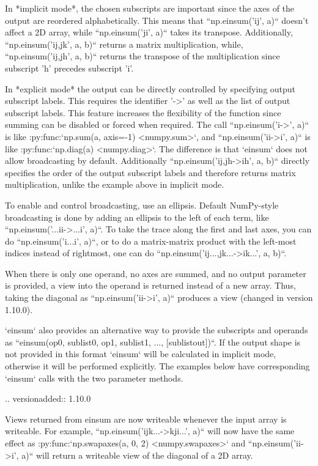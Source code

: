 \begin{DoxyVerb}
In *implicit mode*, the chosen subscripts are important
since the axes of the output are reordered alphabetically.  This
means that ``np.einsum('ij', a)`` doesn't affect a 2D array, while
``np.einsum('ji', a)`` takes its transpose. Additionally,
``np.einsum('ij,jk', a, b)`` returns a matrix multiplication, while,
``np.einsum('ij,jh', a, b)`` returns the transpose of the
multiplication since subscript 'h' precedes subscript 'i'.

In *explicit mode* the output can be directly controlled by
specifying output subscript labels.  This requires the
identifier '->' as well as the list of output subscript labels.
This feature increases the flexibility of the function since
summing can be disabled or forced when required. The call
``np.einsum('i->', a)`` is like :py:func:`np.sum(a, axis=-1) <numpy.sum>`,
and ``np.einsum('ii->i', a)`` is like :py:func:`np.diag(a) <numpy.diag>`.
The difference is that `einsum` does not allow broadcasting by default.
Additionally ``np.einsum('ij,jh->ih', a, b)`` directly specifies the
order of the output subscript labels and therefore returns matrix
multiplication, unlike the example above in implicit mode.

To enable and control broadcasting, use an ellipsis.  Default
NumPy-style broadcasting is done by adding an ellipsis
to the left of each term, like ``np.einsum('...ii->...i', a)``.
To take the trace along the first and last axes,
you can do ``np.einsum('i...i', a)``, or to do a matrix-matrix
product with the left-most indices instead of rightmost, one can do
``np.einsum('ij...,jk...->ik...', a, b)``.

When there is only one operand, no axes are summed, and no output
parameter is provided, a view into the operand is returned instead
of a new array.  Thus, taking the diagonal as ``np.einsum('ii->i', a)``
produces a view (changed in version 1.10.0).

`einsum` also provides an alternative way to provide the subscripts
and operands as ``einsum(op0, sublist0, op1, sublist1, ..., [sublistout])``.
If the output shape is not provided in this format `einsum` will be
calculated in implicit mode, otherwise it will be performed explicitly.
The examples below have corresponding `einsum` calls with the two
parameter methods.

.. versionadded:: 1.10.0

Views returned from einsum are now writeable whenever the input array
is writeable. For example, ``np.einsum('ijk...->kji...', a)`` will now
have the same effect as :py:func:`np.swapaxes(a, 0, 2) <numpy.swapaxes>`
and ``np.einsum('ii->i', a)`` will return a writeable view of the diagonal
of a 2D array.


\end{DoxyVerb}
